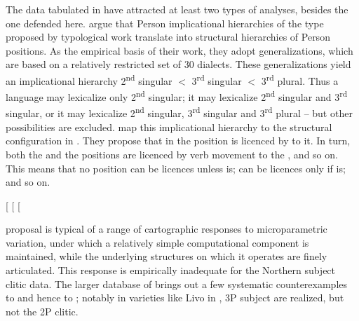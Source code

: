 \documentclass[output=paper]{langsci/langscibook}
\begin{document}
The data tabulated in  have attracted at least two types of
analyses, besides the one defended here. \citet{CardinalettiRepetti2008} argue
that Person implicational hierarchies of the type proposed by typological work
translate into structural hierarchies of Person positions. As the empirical
basis of their work, they adopt  generalizations,
which are based on a relatively restricted set of 30 dialects. These
generalizations yield an implicational hierarchy 2\textsuperscript{nd} singular
$<$ 3\textsuperscript{rd} singular $<$ 3\textsuperscript{rd} plural. Thus a
language may lexicalize only 2\textsuperscript{nd} singular; it may lexicalize
2\textsuperscript{nd} singular and 3\textsuperscript{rd} singular, or it may
lexicalize 2\textsuperscript{nd} singular, 3\textsuperscript{rd} singular and
3\textsuperscript{rd} plural – but other possibilities are excluded.
\citeauthor{CardinalettiRepetti2008} map this implicational hierarchy to the structural
configuration in .  They propose that in 
the \Ssg{} position is licenced by  to it. In turn, both the
\Tsg{} and the \Ssg{} positions are licenced by verb movement to the \Tsg{},
and so on. This means that no position can be licences unless \Ssg{} is; \Tsg{}
can be licences only if \Ssg{} is; and so on.

\ea%
    \label{ex:06.28}
    [\Tpl{} \quad [\Tsg{} \quad [\Ssg{}
\z

 proposal is typical of a range of
cartographic responses to microparametric variation, under which a relatively
simple computational component is maintained, while the underlying structures
on which it operates are finely articulated. This response is empirically
inadequate for the Northern  subject clitic data. The larger database of
\citet{ManziniSavoia2005} brings out a few systematic counterexamples to
\citet{RenziVanelli1983} and hence to \citeauthor{CardinalettiRepetti2008}; notably in
varieties like Livo in , 3P subject  are realized,
but not the 2P clitic.
\end{document}
